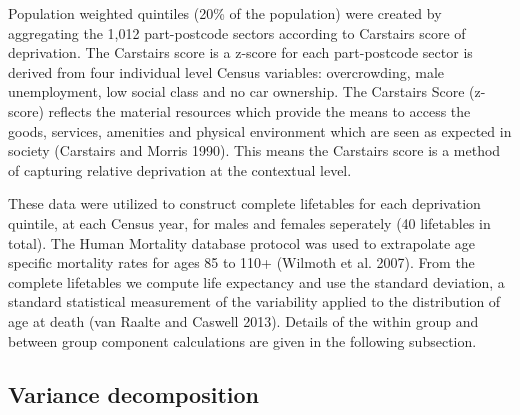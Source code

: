 \documentclass[12pt,oneside,a4paper]{article} %
\theoremstyle{definition}
\begin{document}
Population weighted quintiles (20\% of the population) were created by aggregating the 1,012 part-postcode sectors according to Carstairs score of deprivation. The Carstairs score is a z-score for each part-postcode sector is derived from four individual level Census variables: overcrowding, male unemployment, low social class and no car ownership. The Carstairs Score (z-score) reflects the material resources which provide the means to access the goods, services, amenities and physical environment which are seen as expected in society (Carstairs and Morris 1990). This means the Carstairs score is a method of capturing relative deprivation at the contextual level.

These data were utilized to construct complete lifetables for each deprivation quintile, at each Census year, for males and females seperately (40 lifetables in total). The Human Mortality database protocol was used to extrapolate age specific mortality rates for ages 85 to 110+ (Wilmoth et al. 2007). From the complete lifetables we compute life expectancy and use the standard deviation, a standard statistical measurement of the variability applied to the distribution of age at death (van Raalte and Caswell 2013). Details of the within group and between group component calculations are given in the following subsection.


\subsection{Variance decomposition}
\end{document}
